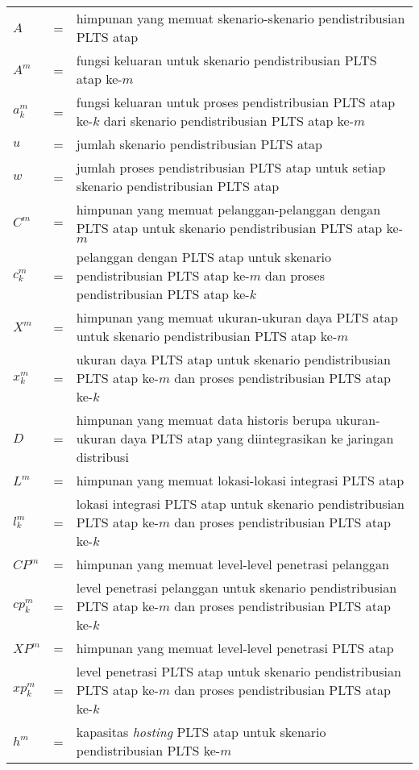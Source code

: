 \setlength{\LTleft}{0pt}
{
\begin{longtable}{llp{288pt}}
$A$								& = & himpunan yang memuat skenario-skenario pendistribusian PLTS atap\\
$A^m$							& = & fungsi keluaran untuk skenario pendistribusian PLTS atap ke-$m$\\
$a^m_k$							& = & fungsi keluaran untuk proses pendistribusian PLTS atap ke-$k$ dari skenario pendistribusian PLTS atap ke-$m$\\
$u$								& = & jumlah skenario pendistribusian PLTS atap\\
$w$								& = & jumlah proses pendistribusian PLTS atap untuk setiap skenario pendistribusian PLTS atap\\
$C^m$							& = & himpunan yang memuat pelanggan-pelanggan dengan PLTS atap untuk skenario pendistribusian PLTS atap ke-$m$\\
$c^m_k$							& = & pelanggan dengan PLTS atap untuk skenario pendistribusian PLTS atap ke-$m$ dan proses pendistribusian PLTS atap ke-$k$\\
$X^m$							& = & himpunan yang memuat ukuran-ukuran daya PLTS atap untuk skenario pendistribusian PLTS atap ke-$m$\\
$x^m_k$							& = & ukuran daya PLTS atap untuk skenario pendistribusian PLTS atap ke-$m$ dan proses pendistribusian PLTS atap ke-$k$\\
$D$								& = & himpunan yang memuat data historis berupa ukuran-ukuran daya PLTS atap yang diintegrasikan ke jaringan distribusi\\
$L^m$							& = & himpunan yang memuat lokasi-lokasi integrasi PLTS atap\\
$l^m_k$							& = & lokasi integrasi PLTS atap untuk skenario pendistribusian PLTS atap ke-$m$ dan proses pendistribusian PLTS atap ke-$k$\\
$CP^m$							& = & himpunan yang memuat level-level penetrasi pelanggan\\
$cp^m_k$						& = & level penetrasi pelanggan untuk skenario pendistribusian PLTS atap ke-$m$ dan proses pendistribusian PLTS atap ke-$k$\\
$XP^m$							& = & himpunan yang memuat level-level penetrasi PLTS atap\\
$xp^m_k$						& = & level penetrasi PLTS atap untuk skenario pendistribusian PLTS atap ke-$m$ dan proses pendistribusian PLTS atap ke-$k$\\
$h^m$							& = & kapasitas \textit{hosting} PLTS atap untuk skenario pendistribusian PLTS ke-$m$\\

\end{longtable}}
